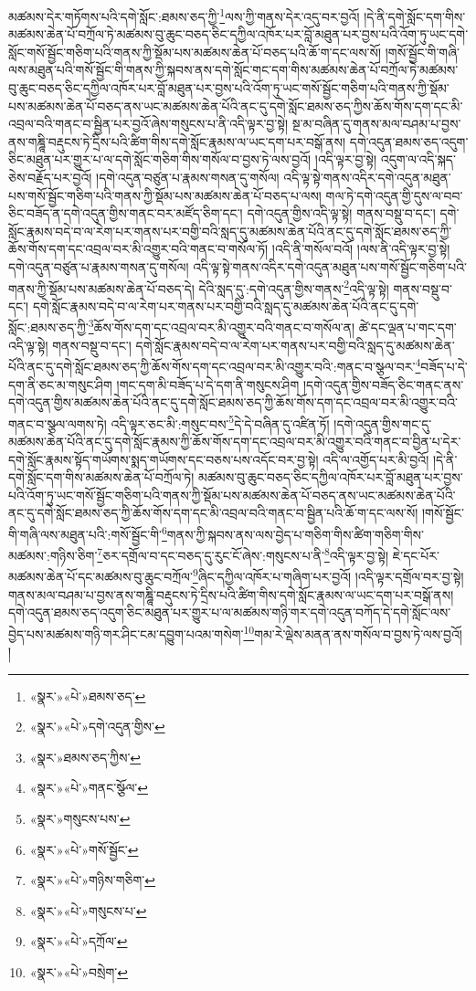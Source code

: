 མཚམས་དེར་གཏོགས་པའི་དགེ་སློང་:ཐམས་ཅད་ཀྱི་\footnote{«སྣར་»«པེ་»ཐམས་ཅད་}ལས་ཀྱི་གནས་དེར་འདུ་བར་བྱའོ། །དེ་ནི་དགེ་སློང་དག་གིས་མཚམས་ཆེན་པོ་བཀྲོལ་ཏེ་མཚམས་བུ་ཆུང་བཅད་ཅིང་དཀྱིལ་འཁོར་པར་བློ་མཐུན་པར་བྱས་པའི་འོག་ཏུ་ཡང་དགེ་སློང་གསོ་སྦྱོང་གཅིག་པའི་གནས་ཀྱི་སྡོམ་པས་མཚམས་ཆེན་པོ་བཅད་པའི་ཆོ་ག་དང་ལས་སོ། །གསོ་སྦྱོང་གི་གཞི་ལས་མཐུན་པའི་གསོ་སྦྱོང་གི་གནས་ཀྱི་སྐབས་ནས་དགེ་སློང་གང་དག་གིས་མཚམས་ཆེན་པོ་བཀྲོལ་ཏེ་མཚམས་བུ་ཆུང་བཅད་ཅིང་དཀྱིལ་འཁོར་པར་བློ་མཐུན་པར་བྱས་པའི་འོག་ཏུ་ཡང་གསོ་སྦྱོང་གཅིག་པའི་གནས་ཀྱི་སྡོམ་པས་མཚམས་ཆེན་པོ་བཅད་ནས་ཡང་མཚམས་ཆེན་པོའི་ནང་དུ་དགེ་སློང་ཐམས་ཅད་ཀྱིས་ཆོས་གོས་དག་དང་མི་འབྲལ་བའི་གནང་བ་སྦྱིན་པར་བྱའོ་ཞེས་གསུངས་པ་ནི་འདི་ལྟར་བྱ་སྟེ། སྔ་མ་བཞིན་དུ་གནས་མལ་བཤམ་པ་བྱས་ནས་གཎྜཱི་བརྡུངས་ཏེ་དྲིས་པའི་ཚིག་གིས་དགེ་སློང་རྣམས་ལ་ཡང་དག་པར་བསྒོ་ནས། དགེ་འདུན་ཐམས་ཅད་འདུག་ཅིང་མཐུན་པར་གྱུར་པ་ལ་དགེ་སློང་གཅིག་གིས་གསོལ་བ་བྱས་ཏེ་ལས་བྱའོ། །འདི་ལྟར་བྱ་སྟེ། འདུག་ལ་འདི་སྐད་ཅེས་བརྗོད་པར་བྱའོ། །དགེ་འདུན་བཙུན་པ་རྣམས་གསན་དུ་གསོལ། འདི་ལྟ་སྟེ་གནས་འདིར་དགེ་འདུན་མཐུན་པས་གསོ་སྦྱོང་གཅིག་པའི་གནས་ཀྱི་སྡོམ་པས་མཚམས་ཆེན་པོ་བཅད་པ་ལས། གལ་ཏེ་དགེ་འདུན་གྱི་དུས་ལ་བབ་ཅིང་བཟོད་ན་དགེ་འདུན་གྱིས་གནང་བར་མཛོད་ཅིག་དང་། དགེ་འདུན་གྱིས་འདི་ལྟ་སྟེ། གནས་བསྡུ་བ་དང་། དགེ་སློང་རྣམས་བདེ་བ་ལ་རེག་པར་གནས་པར་བགྱི་བའི་སླད་དུ་མཚམས་ཆེན་པོའི་ནང་དུ་དགེ་སློང་ཐམས་ཅད་ཀྱི་ཆོས་གོས་དག་དང་འབྲལ་བར་མི་འགྱུར་བའི་གནང་བ་གསོལ་ཏོ། །འདི་ནི་གསོལ་བའོ། །ལས་ནི་འདི་ལྟར་བྱ་སྟེ། དགེ་འདུན་བཙུན་པ་རྣམས་གསན་དུ་གསོལ། འདི་ལྟ་སྟེ་གནས་འདིར་དགེ་འདུན་མཐུན་པས་གསོ་སྦྱོང་གཅིག་པའི་གནས་ཀྱི་སྡོམ་པས་མཚམས་ཆེན་པོ་བཅད་དེ། དེའི་སླད་དུ་:དགེ་འདུན་གྱིས་གནས་\footnote{«སྣར་»«པེ་»དགེ་འདུན་གྱིས་}འདི་ལྟ་སྟེ། གནས་བསྡུ་བ་དང་། དགེ་སློང་རྣམས་བདེ་བ་ལ་རེག་པར་གནས་པར་བགྱི་བའི་སླད་དུ་མཚམས་ཆེན་པོའི་ནང་དུ་དགེ་སློང་:ཐམས་ཅད་ཀྱི་\footnote{«སྣར་»ཐམས་ཅད་ཀྱིས་}ཆོས་གོས་དག་དང་འབྲལ་བར་མི་འགྱུར་བའི་གནང་བ་གསོལ་ན། ཚེ་དང་ལྡན་པ་གང་དག་འདི་ལྟ་སྟེ། གནས་བསྡུ་བ་དང་། དགེ་སློང་རྣམས་བདེ་བ་ལ་རེག་པར་གནས་པར་བགྱི་བའི་སླད་དུ་མཚམས་ཆེན་པོའི་ནང་དུ་དགེ་སློང་ཐམས་ཅད་ཀྱི་ཆོས་གོས་དག་དང་འབྲལ་བར་མི་འགྱུར་བའི་:གནང་བ་སྩལ་བར་\footnote{«སྣར་»«པེ་»གནང་སྩོལ་}བཟོད་པ་དེ་དག་ནི་ཅང་མ་གསུང་ཤིག །གང་དག་མི་བཟོད་པ་དེ་དག་ནི་གསུངས་ཤིག །དགེ་འདུན་གྱིས་བཟོད་ཅིང་གནང་ནས་དགེ་འདུན་གྱིས་མཚམས་ཆེན་པོའི་ནང་དུ་དགེ་སློང་ཐམས་ཅད་ཀྱི་ཆོས་གོས་དག་དང་འབྲལ་བར་མི་འགྱུར་བའི་གནང་བ་སྩལ་ལགས་ཏེ། འདི་ལྟར་ཅང་མི་:གསུང་བས་\footnote{«སྣར་»གསུངས་པས་}དེ་དེ་བཞིན་དུ་འཛིན་ཏོ། །དགེ་འདུན་གྱིས་གང་དུ་མཚམས་ཆེན་པོའི་ནང་དུ་དགེ་སློང་རྣམས་ཀྱི་ཆོས་གོས་དག་དང་འབྲལ་བར་མི་འགྱུར་བའི་གནང་བ་བྱིན་པ་དེར་དགེ་སློང་རྣམས་སྟོད་གཡོགས་སྨད་གཡོགས་དང་བཅས་པས་འདོང་བར་བྱ་སྟེ། འདི་ལ་འགྱོད་པར་མི་བྱའོ། །དེ་ནི་དགེ་སློང་དག་གིས་མཚམས་ཆེན་པོ་བཀྲོལ་ཏེ། མཚམས་བུ་ཆུང་བཅད་ཅིང་དཀྱིལ་འཁོར་པར་བློ་མཐུན་པར་བྱས་པའི་འོག་ཏུ་ཡང་གསོ་སྦྱོང་གཅིག་པའི་གནས་ཀྱི་སྡོམ་པས་མཚམས་ཆེན་པོ་བཅད་ནས་ཡང་མཚམས་ཆེན་པོའི་ནང་དུ་དགེ་སློང་ཐམས་ཅད་ཀྱི་ཆོས་གོས་དག་དང་མི་འབྲལ་བའི་གནང་བ་སྦྱིན་པའི་ཆོ་ག་དང་ལས་སོ། །གསོ་སྦྱོང་གི་གཞི་ལས་མཐུན་པའི་:གསོ་སྦྱོང་གི་\footnote{«སྣར་»«པེ་»གསོ་སྦྱོང་}གནས་ཀྱི་སྐབས་ནས་ལས་བྱེད་པ་གཅིག་གིས་ཚིག་གཅིག་གིས་མཚམས་:གཉིས་ཅིག་\footnote{«སྣར་»«པེ་»གཉིས་གཅིག་}ཅར་དགྲོལ་བ་དང་བཅད་དུ་རུང་ངོ་ཞེས་:གསུངས་པ་ནི་\footnote{«སྣར་»«པེ་»གསུངས་པ་}འདི་ལྟར་བྱ་སྟེ། ཇེ་དང་པོར་མཚམས་ཆེན་པོ་དང་མཚམས་བུ་ཆུང་བཀྲོལ་\footnote{«སྣར་»«པེ་»དཀྲོལ་}ཞིང་དཀྱིལ་འཁོར་པ་གཞིག་པར་བྱའོ། །འདི་ལྟར་དགྲོལ་བར་བྱ་སྟེ། གནས་མལ་བཤམ་པ་བྱས་ནས་གཎྜཱི་བརྡུངས་ཏེ་དྲིས་པའི་ཚིག་གིས་དགེ་སློང་རྣམས་ལ་ཡང་དག་པར་བསྒོ་ནས། དགེ་འདུན་ཐམས་ཅད་འདུག་ཅིང་མཐུན་པར་གྱུར་པ་ལ་མཚམས་གཉི་གར་དགེ་འདུན་བཀོད་དེ་དགེ་སློང་ལས་བྱེད་པས་མཚམས་གཉི་གར་ཤིང་ངམ་དབྱུག་པའམ་གསེག་\footnote{«སྣར་»«པེ་»བསྲེག་}གམ་རེ་ལྡེས་མནན་ནས་གསོལ་བ་བྱས་ཏེ་ལས་བྱའོ། །
